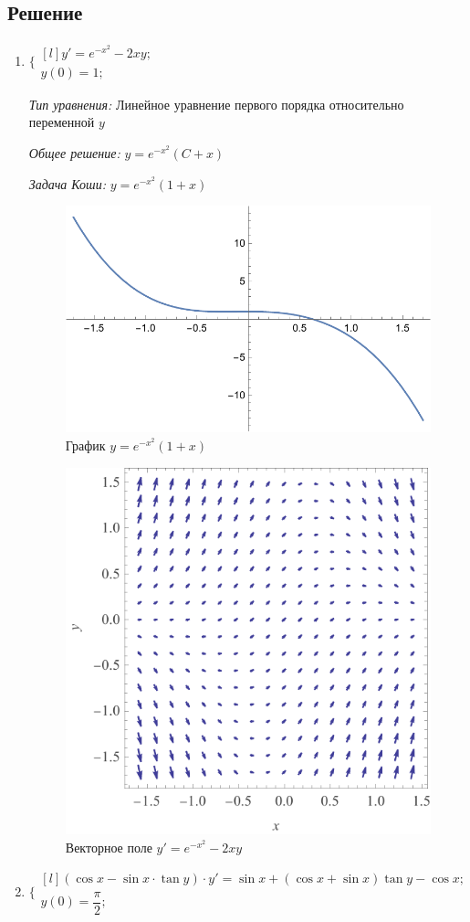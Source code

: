 \documentclass[a4paper, 14pt, titlepage, fleqn]{extarticle}
\begin{document}
		\subsection*{Решение}
			\begin{enumerate}
				\item \(\bigg\{ \begin{matrix*}[l] y' = e^{-x^2} - 2xy; \\  y(0) = 1; \end{matrix*}\)

					\textit{Тип уравнения:} Линейное уравнение первого порядка относительно переменной \(y\)					

					\textit{Общее решение:} \( y = e^{-x^2}(C+x) \)
	
					\textit{Задача Коши:} \( y = e^{-x^2}(1+x) \)

					\begin{figure}[H]
					   	\centering
					    	\includegraphics[width = .5\linewidth]{2.1.pdf}
						\caption[.] {График \( y = e^{-x^2}(1+x) \)}
  					\end{figure}
					\begin{figure}[H]
					   	\centering
					    	\includegraphics[width = .5\linewidth]{2.1vf.pdf}
						\caption[.] {Векторное поле \( y' = e^{-x^2} - 2xy \)}
  					\end{figure}
				
				\item \(\Bigg\{ \begin{matrix*}[l] (\cos{x} - \sin{x} \cdot \tan{y}) \cdot y' = \sin{x} + (\cos{x} + \sin{x})\tan{y} - \cos{x}; \\ y(0) = \dfrac{\pi}{2}; \end{matrix*}\)


\end{enumerate}
\end{document}
